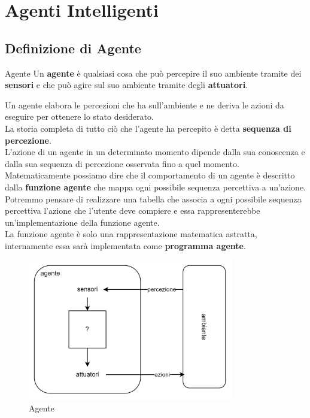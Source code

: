 \chapter{Agenti Intelligenti}

\section{Definizione di Agente}

\begin{definition-box}{Agente}
Un \textbf{agente} è qualsiasi cosa che può percepire il suo ambiente
tramite dei \textbf{sensori} e che può agire sul suo ambiente
tramite degli \textbf{attuatori}.
\end{definition-box}

Un agente elabora le percezioni che ha sull'ambiente e ne deriva le azioni da
eseguire per ottenere lo stato desiderato.\\

La storia completa di tutto ciò che l'agente ha percepito è detta
\textbf{sequenza di percezione}.\\

L'azione di un agente in un determinato momento dipende dalla sua conoscenza e
dalla sua sequenza di percezione osservata fino a quel momento.\\

Matematicamente possiamo dire che il comportamento di un agente è descritto
dalla \textbf{funzione agente} che mappa ogni possibile sequenza percettiva a
un'azione.\\

Potremmo pensare di realizzare una tabella che associa a ogni possibile
sequenza percettiva l'azione che l'utente deve compiere e essa rappresenterebbe
un'implementazione della funzione agente.\\

La funzione agente è solo una rappresentazione matematica astratta,
internamente essa sarà implementata come \textbf{programma agente}.\\

\begin{figure}[H]
	\centering
	\includegraphics[width=0.8\textwidth]{capitoli/agenti-intelligenti/imgs/agente.png}
	\caption{Agente}
	\label{fig:immagine1}
\end{figure}

